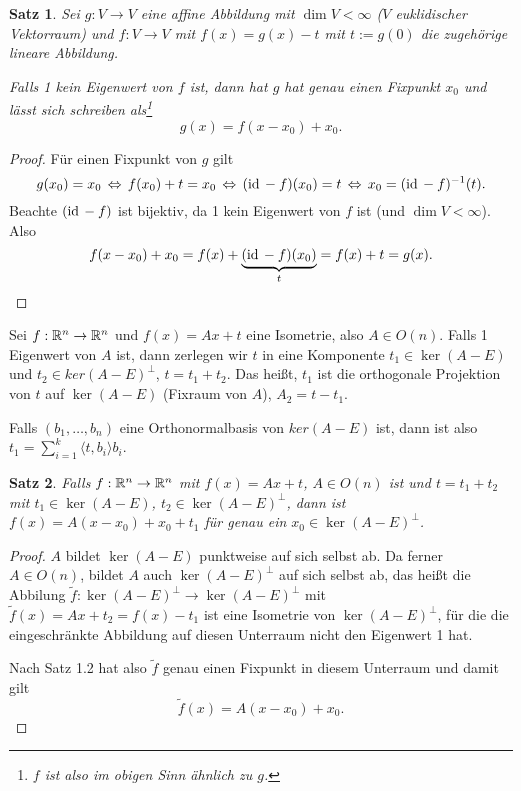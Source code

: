 \documentclass[
 a4paper,
 12pt,
 parskip=half
 ]{scrartcl}
\theoremstyle{plain}
\newtheorem{thm}{Satz}[section] %
\theoremstyle{definition}
\numberwithin{equation}{section}
\begin{document}
\begin{thm}
 Sei $g: V \to V$ eine affine Abbildung mit $\dim V < \infty$ ($V$ euklidischer Vektorraum) und $f: V \to V$ mit $f(x) = g(x) - t$ mit $t := g(0)$ die zugehörige lineare Abbildung.
 
 Falls 1 \emph{kein} Eigenwert von $f$ ist, dann hat $g$ hat genau einen Fixpunkt $x_0$ und lässt sich schreiben als\footnote{$f$ ist also im obigen Sinn ähnlich zu $g$.}
 \[ g(x) = f(x-x_0) + x_0. \]
\end{thm}

\begin{proof}
 Für einen Fixpunkt von $g$ gilt
 \[ g(x_0) = x_0 \,\Leftrightarrow\, f(x_0) + t = x_0 \,\Leftrightarrow\, (\mathrm{id}\, - f)(x_0) = t \,\Leftrightarrow\, x_0 = (\mathrm{id}\, - f)^{-1}(t). \]
 Beachte $(\mathrm{id}\, -f)$ ist bijektiv, da 1 kein Eigenwert von $f$ ist (und $\dim V < \infty$). Also
 \[ f(x - x_0) + x_0 = f(x) + \underbrace{(\mathrm{id}\,-f)(x_0)}_{t} = f(x) + t = g(x). \]
\end{proof}

Sei $f:\mathbb{R}^n \to \mathbb{R}^n$ und $f(x) = Ax + t$ eine Isometrie, also $A \in O(n)$. Falls 1 Eigenwert von $A$ ist, dann zerlegen wir $t$ in eine Komponente $t_1 \in \ker(A-E)$ und $t_2 \in ker(A-E)^\bot$, $t = t_1 + t_2$. Das heißt, $t_1$ ist die orthogonale Projektion von $t$ auf $\ker(A-E)$ (Fixraum von $A$), $A_2 = t - t_1$.

\begin{bem}
 Falls $(b_1, \ldots, b_n)$ eine Orthonormalbasis von $ker(A-E)$ ist, dann ist also $t_1 = \sum_{i=1}^k \langle t, b_i \rangle b_i$.
\end{bem}

\begin{thm}
 Falls $f: \mathbb{R}^n \to \mathbb{R}^n$ mit $f(x) = Ax + t$, $A \in O(n)$ ist und $t = t_1 + t_2$ mit $t_1 \in \ker(A-E)$, $t_2 \in \ker(A-E)^\bot$, dann ist $f(x) = A(x-x_0) + x_0 + t_1$ für genau ein $x_0 \in \ker(A-E)^\bot$.
\end{thm}

\begin{proof}
 $A$ bildet $\ker(A-E)$ punktweise auf sich selbst ab. Da ferner $A \in O(n)$, bildet $A$ auch $\ker(A-E)^\bot$ auf sich selbst ab, das heißt die Abbilung $\tilde{f}: \ker(A-E)^\bot \to \ker(A-E)^\bot$ mit $\tilde{f}(x) = Ax + t_2 = f(x) - t_1$ ist eine Isometrie von $\ker(A-E)^\bot$, für die die eingeschränkte Abbildung auf diesen Unterraum nicht den Eigenwert 1 hat.
 
 Nach Satz 1.2 hat also $\tilde{f}$ genau einen Fixpunkt in diesem Unterraum und damit gilt
 \[ \tilde{f}(x) = A(x-x_0) + x_0. \]
\end{proof}
\end{document}
